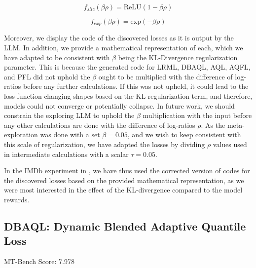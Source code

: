 \documentclass{article}
\theoremstyle{plain}
\theoremstyle{definition}
\theoremstyle{remark}
\begin{document}
\begin{equation}
    f_{slic}(\beta\rho) = \text{ReLU}(1-\beta\rho)
\end{equation}

\begin{equation}
    f_{exp}(\beta\rho) = \text{exp}(-\beta\rho)
\end{equation}

Moreover, we display the code of the discovered losses as it is output by the LLM. In addition, we provide a mathematical representation of each, which we have adapted to be consistent with $\beta$ being the KL-Divergence regularization parameter. This is because the generated code for LRML, DBAQL, AQL, AQFL, and PFL did not uphold the $\beta$ ought to be multiplied with the difference of log-ratios before any further calculations. If this was not upheld, it could lead to the loss function changing shapes based on the KL-regularization term, and therefore, models could not converge or potentially collapse. In future work, we should constrain the exploring LLM to uphold the $\beta$ multiplication with the input before any other calculations are done with the difference of log-ratios $\rho$. As the meta-exploration was done with a set $\beta = 0.05$, and we wish to keep consistent with this scale of regularization, we have adapted the losses by dividing $\rho$ values used in intermediate calculations with a scalar $\tau = 0.05$. 

In the IMDb experiment in , we have thus used the corrected version of codes for the discovered losses based on the provided mathematical representation, as we were most interested in the effect of the KL-divergence compared to the model rewards.


\subsection{DBAQL: Dynamic Blended Adaptive Quantile Loss}
MT-Bench Score: 7.978
\end{document}
